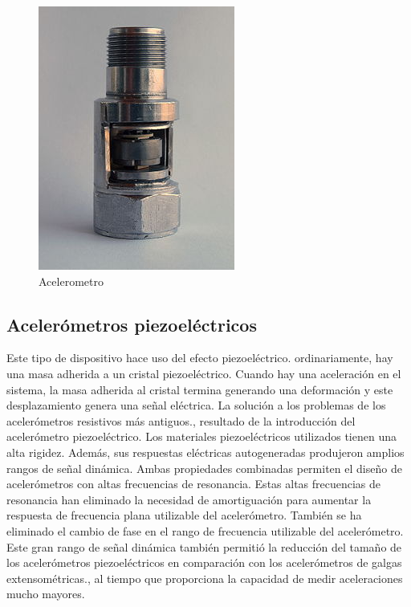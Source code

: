 \begin{figure}[h]
	\centering
	\includegraphics[width=0.7\linewidth]{img/acelerometro.png}
	\caption{Acelerometro}
	\label{fig:insertarimagen}
\end{figure}

\subsection{Acelerómetros piezoeléctricos }

Este tipo de dispositivo hace uso del efecto piezoeléctrico. ordinariamente, hay una masa adherida a un cristal piezoeléctrico. Cuando hay una aceleración en el sistema, la masa adherida al cristal termina generando una deformación y este desplazamiento genera una señal eléctrica.
La solución a los problemas de los acelerómetros resistivos más antiguos., resultado de la introducción del acelerómetro piezoeléctrico. Los materiales piezoeléctricos utilizados tienen una alta rigidez. Además, sus respuestas eléctricas autogeneradas produjeron amplios rangos de señal dinámica. Ambas propiedades combinadas permiten el diseño de acelerómetros con altas frecuencias de resonancia. Estas altas frecuencias de resonancia han eliminado la necesidad de amortiguación para aumentar la respuesta de frecuencia plana utilizable del acelerómetro. También se ha eliminado el cambio de fase en el rango de frecuencia utilizable del acelerómetro. Este gran rango de señal dinámica también permitió la reducción del tamaño de los acelerómetros piezoeléctricos en comparación con los acelerómetros de galgas extensométricas., al tiempo que proporciona la capacidad de medir aceleraciones mucho mayores.

